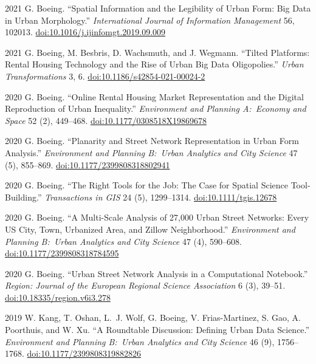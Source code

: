 \documentclass[11pt,letterpaper]{report}
\begin{document}
\begin{tablist}
        \item[2021] \tab{}G. Boeing. \enquote{Spatial Information and the Legibility of Urban Form: Big Data in Urban Morphology.} \textit{International Journal of Information Management} 56, 102013. \href{https://doi.org/10.1016/j.ijinfomgt.2019.09.009}{doi:10.1016/j.ijinfomgt.2019.09.009}

        \item[2021] \tab{}G. Boeing, M. Besbris, D. Wachsmuth, and J. Wegmann. \enquote{Tilted Platforms: Rental Housing Technology and the Rise of Urban Big Data Oligopolies.} \textit{Urban Transformations} 3, 6. \href{https://doi.org/10.1186/s42854-021-00024-2}{doi:10.1186/s42854-021-00024-2}

        \item[2020] \tab{}G. Boeing. \enquote{Online Rental Housing Market Representation and the Digital Reproduction of Urban Inequality.} \textit{Environment and Planning A:\ Economy and Space} 52 (2), 449--468. \href{https://doi.org/10.1177/0308518X19869678}{doi:10.1177/0308518X19869678}

        \item[2020] \tab{}G. Boeing. \enquote{Planarity and Street Network Representation in Urban Form Analysis.} \textit{Environment and Planning B:\ Urban Analytics and City Science} 47 (5), 855--869. \href{https://doi.org/10.1177/2399808318802941}{doi:10.1177/2399808318802941}

        \item[2020] \tab{}G. Boeing. \enquote{The Right Tools for the Job: The Case for Spatial Science Tool-Building.} \textit{Transactions in GIS} 24 (5), 1299--1314. \href{https://doi.org/10.1111/tgis.12678}{doi:10.1111/tgis.12678}

        \item[2020] \tab{}G. Boeing. \enquote{A Multi-Scale Analysis of 27,000 Urban Street Networks: Every US City, Town, Urbanized Area, and Zillow Neighborhood.} \textit{Environment and Planning B:\ Urban Analytics and City Science} 47 (4), 590--608. \href{https://doi.org/10.1177/2399808318784595}{doi:10.1177/2399808318784595}

        \item[2020] \tab{}G. Boeing. \enquote{Urban Street Network Analysis in a Computational Notebook.} \textit{Region: Journal of the European Regional Science Association} 6 (3), 39--51. \href{https://doi.org/10.18335/region.v6i3.278}{doi:10.18335/region.v6i3.278}

        \item[2019] \tab{}W. Kang, T. Oshan, L.~J. Wolf, G. Boeing, V. Frias-Martinez, S. Gao, A. Poorthuis, and W. Xu. \enquote{A Roundtable Discussion: Defining Urban Data Science.} \textit{Environment and Planning B:\ Urban Analytics and City Science} 46 (9), 1756--1768. \href{https://doi.org/10.1177/2399808319882826}{doi:10.1177/2399808319882826}


\end{tablist}
\end{document}
